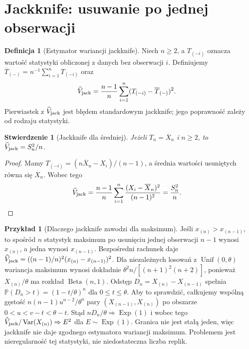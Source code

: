 \documentclass[11pt,a4paper,oneside]{report}
\numberwithin{equation}{chapter}
\theoremstyle{plain}
\newtheorem{stwierdzenie}[twierdzenie]{Stwierdzenie}
\theoremstyle{definition}
\newtheorem{definicja}{Definicja}[chapter]
\newtheorem{przyklad}{Przykład}[chapter]
\theoremstyle{remark}
\newcommand{\Prob}{\mathbb P}
\newcommand{\Var}{\operatorname{Var}}
\begin{document}
\section{Jackknife: usuwanie po jednej obserwacji}
\begin{definicja}[Estymator wariancji jackknife]
\label{def:jackknife}
Niech $n\ge2$, a $T_{(-i)}$ oznacza wartość statystyki
obliczonej z danych bez obserwacji $i$.
Definiujemy $\overline T_{(-)}=n^{-1}\sum_{i=1}^nT_{(-i)}$
oraz
\[
 \widehat V_{\rm jack}=
 \frac{n-1}{n}\sum_{i=1}^n(T_{(-i)}-\overline T_{(-)})^2.
\]
Pierwiastek z $\widehat V_{\rm jack}$ jest błędem standardowym
jackknife; jego poprawność zależy od rodzaju statystyki.
\end{definicja}
\begin{stwierdzenie}[Jackknife dla średniej]
\label{prop:jackknife-mean}
Jeżeli $T_n=\overline X_n$ i $n\ge2$, to
$\widehat V_{\rm jack}=S_n^2/n$.
\end{stwierdzenie}
\begin{proof}
Mamy $T_{(-i)}=(n\overline X_n-X_i)/(n-1)$,
a średnia wartości usuniętych równa się $\overline X_n$.
Wobec tego
\[
 \widehat V_{\rm jack}=
 \frac{n-1}{n}\sum_{i=1}^n
 \frac{(X_i-\overline X_n)^2}{(n-1)^2}
 =\frac{S_n^2}{n}.
\]
\end{proof}

\begin{przyklad}[Dlaczego jackknife zawodzi dla maksimum]
Jeśli $x_{(n)}>x_{(n-1)}$, to spośród $n$ statystyk
maksimum po usunięciu jednej obserwacji $n-1$ wynosi
$x_{(n)}$, a jedna wynosi $x_{(n-1)}$.
Bezpośredni rachunek daje
$\widehat V_{\rm jack}=((n-1)/n)^2
(x_{(n)}-x_{(n-1)})^2$.
Dla niezależnych losowań z $\operatorname{Unif}(0,\theta)$
wariancja maksimum wynosi dokładnie
$\theta^2 n/[(n+1)^2(n+2)]$, ponieważ
$X_{(n)}/\theta$ ma rozkład $\operatorname{Beta}(n,1)$.
Odstęp $D_n=X_{(n)}-X_{(n-1)}$ spełnia
$\Prob(D_n>t)=(1-t/\theta)^n$ dla $0\le t\le\theta$.
Aby to sprawdzić, całkujemy wspólną gęstość
$n(n-1)u^{n-2}/\theta^n$ pary
$(X_{(n-1)},X_{(n)})$ po obszarze
$0<u<v-t<\theta-t$.
Stąd $nD_n/\theta\Rightarrow\operatorname{Exp}(1)$
i wobec tego
$\widehat V_{\rm jack}/\Var(X_{(n)})
\Rightarrow E^2$ dla $E\sim\operatorname{Exp}(1)$.
Granica nie jest stałą jeden, więc jackknife nie daje
zgodnego estymatora wariancji maksimum. Problemem jest
nieregularność tej statystyki, nie niedostateczna liczba
replik.
\end{przyklad}
\end{document}
